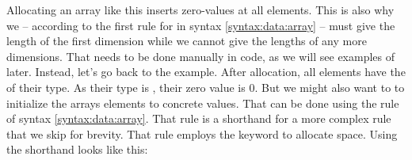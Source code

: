 \inputminted[firstline=3]{csharp}{../src/csharp/primdata/array_alloc/Program.cs}

Allocating an array like this inserts zero-values at all elements. This is also why we -- according to the first rule for  in syntax \ref{syntax:data:array} -- must give the length of the first dimension while we cannot give the lengths of any more  dimensions. That needs to be done manually in code, as we will see examples of later. Instead, let's go back to the  example. After allocation, all elements have the  of their type. As their type is , their zero value is 0. But we might also want to to initialize the arrays elements to concrete values. That can be done using the  rule of syntax \ref{syntax:data:array}. That rule is a shorthand for a more complex rule that we skip for brevity. That rule employs the  keyword to allocate space. Using the shorthand looks like this:

\inputminted[lastline=1]{csharp}{../src/csharp/primdata/months/Program.cs}

